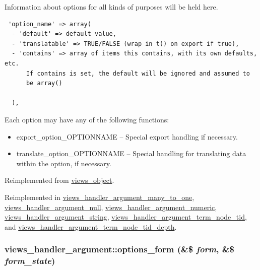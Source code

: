 Information about options for all kinds of purposes will be held here. 

\begin{Code}\begin{verbatim} 'option_name' => array(
  - 'default' => default value,
  - 'translatable' => TRUE/FALSE (wrap in t() on export if true),
  - 'contains' => array of items this contains, with its own defaults, etc.
      If contains is set, the default will be ignored and assumed to
      be array()

  ),
\end{verbatim}
\end{Code}

 Each option may have any of the following functions:\begin{itemize}
\item export\_\-option\_\-OPTIONNAME -- Special export handling if necessary.\item translate\_\-option\_\-OPTIONNAME -- Special handling for translating data within the option, if necessary. \end{itemize}


Reimplemented from \hyperlink{classviews__object_b0753d0001c8c9ff98beee696b4516ba}{views\_\-object}.

Reimplemented in \hyperlink{classviews__handler__argument__many__to__one_4c28692f87058983cc6a4a4d018d710e}{views\_\-handler\_\-argument\_\-many\_\-to\_\-one}, \hyperlink{classviews__handler__argument__null_8ba4c40627657d548ad011a1e203d00f}{views\_\-handler\_\-argument\_\-null}, \hyperlink{classviews__handler__argument__numeric_d2b7dc4afcf4d444e18752cfbd23ec63}{views\_\-handler\_\-argument\_\-numeric}, \hyperlink{classviews__handler__argument__string_f27f79196cc9e29b2bbc635a896510e1}{views\_\-handler\_\-argument\_\-string}, \hyperlink{classviews__handler__argument__term__node__tid_aa442cbd37f901be13e6db17f61e8d02}{views\_\-handler\_\-argument\_\-term\_\-node\_\-tid}, and \hyperlink{classviews__handler__argument__term__node__tid__depth_e285fe11521bfb9a6cd4f79b498a28a7}{views\_\-handler\_\-argument\_\-term\_\-node\_\-tid\_\-depth}.\hypertarget{classviews__handler__argument_44f015a0d527983ae6df2689f66b2c24}{
\subsubsection[{options\_\-form}]{\setlength{\rightskip}{0pt plus 5cm}views\_\-handler\_\-argument::options\_\-form (\&\$ {\em form}, \/  \&\$ {\em form\_\-state})}}
\label{classviews__handler__argument_44f015a0d527983ae6df2689f66b2c24}


